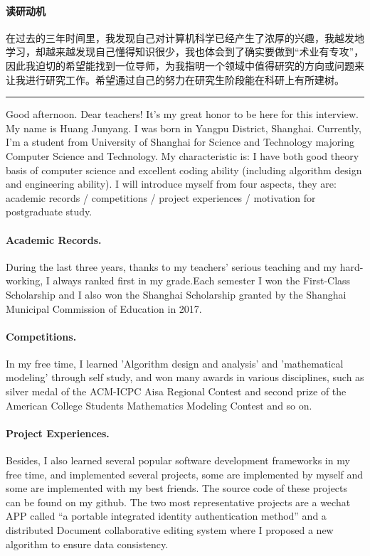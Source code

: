 \documentclass[letterpaper]{article}
\begin{document}
\paragraph{读研动机}
在过去的三年时间里，我发现自己对计算机科学已经产生了浓厚的兴趣，我越发地学习，却越来越发现自己懂得知识很少，我也体会到了确实要做到“术业有专攻”，因此我迫切的希望能找到一位导师，为我指明一个领域中值得研究的方向或问题来让我进行研究工作。希望通过自己的努力在研究生阶段能在科研上有所建树。
\vspace{0.8cm}
\hrule
\vspace{0.8cm}
Good afternoon. Dear teachers! It's my great honor to be here for this interview. My name is Huang Junyang. I was born in Yangpu District, Shanghai. Currently, I'm a student from University of Shanghai for Science and Technology majoring Computer Science and Technology. My characteristic is: I have both good theory basis of computer science and excellent coding ability (including algorithm design and engineering ability). I will introduce myself from four aspects, they are: academic records / competitions / project experiences / motivation for postgraduate study.

\paragraph{Academic Records.}
During the last three years, thanks to my teachers' serious teaching and my hard-working, I always ranked first in my grade.Each semester I won the First-Class Scholarship and I also won the Shanghai Scholarship granted by the Shanghai Municipal Commission of Education in 2017.

\paragraph{Competitions.}
In my free time, I learned 'Algorithm design and analysis' and 'mathematical modeling' through self study, and won many awards in various disciplines, such as silver medal of the ACM-ICPC Aisa Regional Contest and second prize of the American College Students Mathematics Modeling Contest and so on.

\paragraph{Project Experiences.}
Besides, I also learned several popular software development frameworks in my free time, and implemented several projects, some are implemented by myself and some are implemented with my best friends. The source code of these projects can be found on my github. The two most representative projects are a wechat APP called “a portable integrated identity authentication method” and a distributed Document collaborative editing system where I proposed a new algorithm to ensure data consistency.
\end{document}
